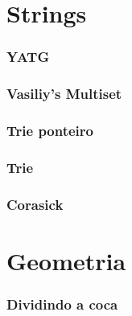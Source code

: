 \documentclass[a4paper,12pt]{article}
\newcommand\includess[4]{
   \subsubsection{#2}
   
}
\begin{document}
\begin{multicols}{2}
\section{Strings}
\includess{c++}{YATG}{strings}{YATG.cpp}
\includess{c++}{Vasiliy's Multiset}{strings}{multiset.cpp}
\includess{c++}{Trie ponteiro}{strings}{trie_ponteiro.cpp}
\includess{c++}{Trie}{strings}{trieXor.cpp}
\includess{c++}{Corasick}{strings}{aho-corasick.cpp}

\section{Geometria}
\includess{c++}{Dividindo a coca}{geometria}{coca.cpp}


\end{multicols}
\end{document}
